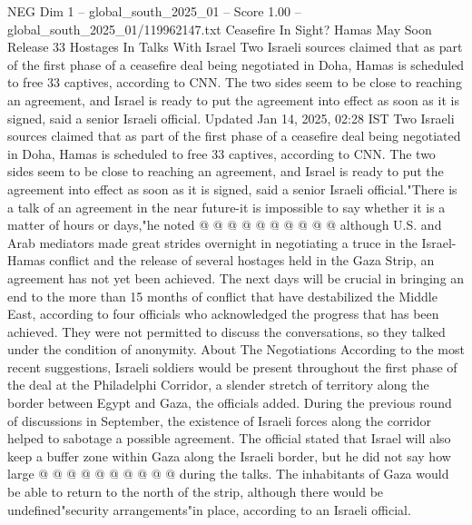 \begin{textsample}{NEG Dim 1 – global\_south\_2025\_01 – Score 1.00 – global\_south\_2025\_01/119962147.txt}  \label{ex:f1_neg_153}
Ceasefire In Sight?
Hamas May Soon Release 33 Hostages In Talks With Israel Two Israeli sources claimed that as part of the first phase of a ceasefire deal being negotiated in Doha, Hamas is scheduled to free 33 captives, according to CNN.
The two sides seem to be close to reaching an agreement, and Israel is ready to put the agreement into effect as soon as it is signed, said a senior Israeli official.
Updated Jan 14, 2025, 02:28 IST Two Israeli sources claimed that as part of the first phase of a ceasefire deal being negotiated in Doha, Hamas is scheduled to free 33 captives, according to CNN.
The two sides seem to be close to reaching an agreement, and Israel is ready to put the agreement into effect as soon as it is signed, said a senior Israeli official."There is a talk of an agreement in the near future-it is impossible to say whether it is a matter of hours or days,"he noted @ @ @ @ @ @ @ @ @ @ although U.S. and Arab mediators made great strides overnight in negotiating a truce in the Israel-Hamas conflict and the release of several hostages held in the Gaza Strip, an agreement has not yet been achieved.
The next days will be crucial in bringing an end to the more than 15 months of conflict that have destabilized the Middle East, according to four officials who acknowledged the progress that has been achieved.
They were not permitted to discuss the conversations, so they talked under the condition of anonymity.
About The Negotiations According to the most recent suggestions, Israeli soldiers would be present throughout the first phase of the deal at the Philadelphi Corridor, a slender stretch of territory along the border between Egypt and Gaza, the officials added.
During the previous round of discussions in September, the existence of Israeli forces along the corridor helped to sabotage a possible agreement.
The official stated that Israel will also keep a buffer zone within Gaza along the Israeli border, but he did not say how large @ @ @ @ @ @ @ @ @ @ during the talks.
The inhabitants of Gaza would be able to return to the north of the strip, although there would be undefined"security arrangements"in place, according to an Israeli official.

\end{textsample}
